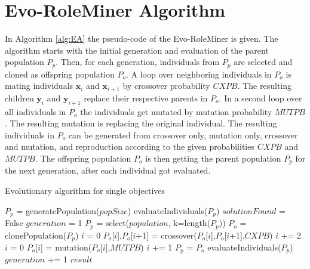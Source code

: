 \section{Evo-RoleMiner Algorithm}
	In Algorithm \ref{alg:EA} the pseudo-code of the Evo-RoleMiner is given. The algorithm starts with the initial generation and evaluation of the parent population $P_p$. Then, for each generation, individuals from $P_p$ are selected and cloned as offspring population $P_o$. A loop over neighboring individuals in $P_o$ is mating individuals $\mathbf{x}_i$ and $\mathbf{x}_{i+1}$ by crossover probability $CXPB$. The resulting children $\mathbf{y}_i$ and $\mathbf{y}_{i+1}$ replace their respective parents in $P_o$. In a second loop over all individuals in $P_o$ the individuals get mutated by mutation probability $MUTPB$. The resulting mutation is replacing the original individual. The resulting individuals in $P_o$ can be generated from crossover only, mutation only, crossover and mutation, and reproduction according to the given probabilities $CXPB$ and $MUTPB$. The offspring population $P_o$ is then getting the parent population $P_p$ for the next generation, after each individual got evaluated.
	\begin{algorithm}[H]
	   	\caption{Evolutionary algorithm for single objectives}
	   	\label{alg:EA}
	   	\begin{algorithmic}[1]
	   		\State $P_p$ = generatePopulation($popSize$)
	   		\State evaluateIndividuals($P_p$)
	   		\State $solutionFound$ = False
	   		\State $generation$ = 1
	   		\State $P_p$ = select($population$, k=length($P_p$))
	   		\State $P_o$ = clonePopulation($P_p$)
	   		\State $i$ = 0
	   		\State $P_o$[$i$],$P_o$[$i$+1] = crossover($P_o$[$i$],$P_o$[$i$+1],$CXPB$)
	   		\State $i$ += 2
	   		\EndWhile
	   		\State $i$ = 0
	   		\State $P_o$[$i$] = mutation($P_o$[$i$],$MUTPB$)
	   		\State $i$ += 1
	   		\EndWhile
	   		\State $P_p$ = $P_o$
	   		\State evaluateIndividuals($P_p$)
	   		\State $generation$ += 1
	   		\EndWhile
	   		\State \Return $result$
	   		\EndProcedure
	   	\end{algorithmic}
	\end{algorithm}

